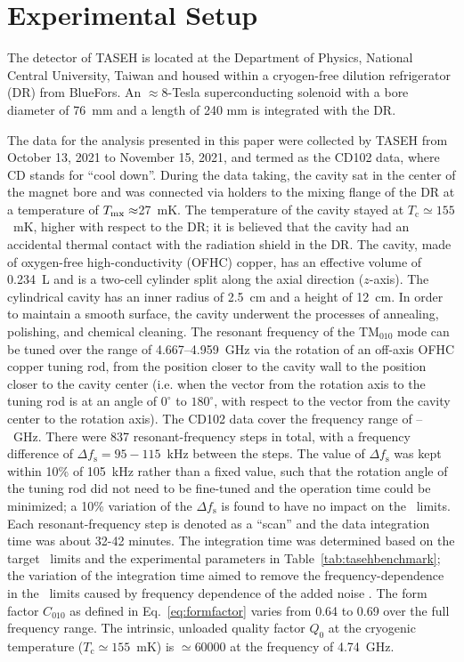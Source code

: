 
\section{Experimental Setup}\label{sec:taseh} 
The detector of TASEH is located at the Department of Physics, National 
Central University, Taiwan and housed within a cryogen-free dilution 
refrigerator (DR) from BlueFors. An $\approx$8-Tesla superconducting solenoid 
with a 
bore diameter of 76~mm and a length of 240 mm is integrated with the DR. 

The data for the analysis presented in this paper were collected by TASEH 
from October 13, 2021 to November 15, 2021, and termed as the CD102 data, 
where CD stands for ``cool down''. 
During the data taking, the cavity sat in the center of the magnet bore 
and was connected via holders to the mixing flange of the DR at a 
temperature of $T_{\rm mx}\approx$27~mK. 
The temperature of the cavity stayed at $T_\text{c}\simeq155$~mK, higher 
with respect to the 
DR; it is believed that the cavity had an accidental thermal contact with the 
radiation shield in the DR. 
The cavity, made of oxygen-free high-conductivity (OFHC) copper, has an 
effective volume of 0.234~L and is a two-cell cylinder split along 
the axial direction ($z$-axis). 
The cylindrical cavity has an inner radius of 2.5~cm and a 
height of 12~cm.  In order to maintain a smooth surface, the cavity underwent 
the processes of annealing, polishing, and chemical cleaning. The resonant 
frequency of the TM$_{010}$ mode can be tuned over the range of 
4.667--4.959~GHz via the rotation of an off-axis OFHC copper tuning rod, from 
the position closer to the cavity wall to the position closer to the cavity 
center (i.e. when the vector from the rotation axis to the tuning rod is 
at an angle of $0^\circ$ to $180^\circ$, with respect to the vector from the 
cavity center to the rotation axis). 
The CD102 data cover the frequency range of \flo--\fhi~GHz. 
There were 837 resonant-frequency steps in total, with a frequency difference 
of $\Delta f_\text{s}=95-115$~kHz between the steps. The value of 
$\Delta f_\text{s}$ was kept within 10\% of 105~kHz rather than 
a fixed value, such that the rotation angle of the tuning rod did not need to 
be fine-tuned and the operation time could be minimized; a 10\% variation of 
the $\Delta f_\text{s}$ is found to have no impact on the \gagg\ limits. 
Each resonant-frequency step is denoted as a ``scan'' 
and the data integration time was about 32-42 minutes. The integration 
time was determined based on the target \gagg\ limits and the experimental 
parameters in Table~\ref{tab:tasehbenchmark}; the variation of the integration 
time aimed to remove the frequency-dependence in the \gagg\ limits caused by   
frequency dependence of the added noise \ta. The form factor $C_{010}$ as 
defined in Eq.~\eqref{eq:formfactor} varies from 0.64 to 0.69 over the 
full frequency range.  
The intrinsic, unloaded quality factor $Q_0$ at the cryogenic temperature 
($T_\mathrm{c}\simeq 155$~mK) is $\simeq 60000$ at the frequency of 
4.74~GHz.

